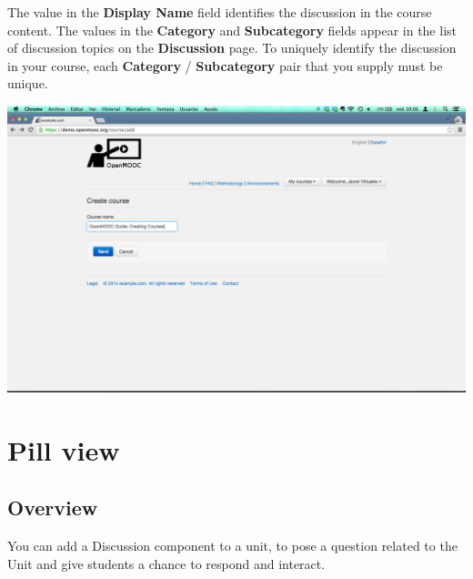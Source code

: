 \documentclass[letterpaper,10pt,english]{sphinxmanual}
\begin{document}
\begin{enumerate}
The value in the \textbf{Display Name} field identifies the discussion in the
course content. The values in the \textbf{Category} and \textbf{Subcategory} fields
appear in the list of discussion topics on the \textbf{Discussion} page. To
uniquely identify the discussion in your course, each \textbf{Category} /
\textbf{Subcategory} pair that you supply must be unique.

\includegraphics{3_create_course-3.png}

\end{enumerate}


\chapter{Pill view}
\label{pill_view:pill-view}\label{pill_view::doc}\label{pill_view:id1}

\section{Overview}
\label{pill_view:overview}
You can add a Discussion component to a unit, to pose a question related to the
Unit and give students a chance to respond and interact.
\end{document}
